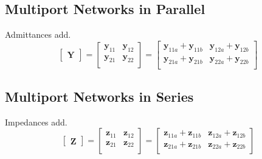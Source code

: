 	\subsection*{Multiport Networks in Parallel} \label{subsec:Parallel Multiport Networks}
	Admittances add.
		\begin{equation*} \label{eq:Parallel Multiport Networks}
			\begin{bmatrix}
				\mathbf{Y}
			\end{bmatrix}
			= \begin{bmatrix}
				\mathbf{y}_{11} & \mathbf{y}_{12} \\
				\mathbf{y}_{21} & \mathbf{y}_{22} \\
			\end{bmatrix}
			= \begin{bmatrix}
				\mathbf{y}_{11a}+\mathbf{y}_{11b} & \mathbf{y}_{12a}+\mathbf{y}_{12b} \\
				\mathbf{y}_{21a}+\mathbf{y}_{21b} & \mathbf{y}_{22a}+\mathbf{y}_{22b} \\
			\end{bmatrix}
		\end{equation*}
	
	\vspace{-4mm}	
	\subsection*{Multiport Networks in Series} \label{subsec:Series Multiport Networks}
	Impedances add.
		\begin{equation*} \label{eq:Series Multiport Networks}
			\begin{bmatrix}
				\mathbf{Z}
			\end{bmatrix}
			= \begin{bmatrix}
				\mathbf{z}_{11} & \mathbf{z}_{12} \\
				\mathbf{z}_{21} & \mathbf{z}_{22} \\
			\end{bmatrix}
			= \begin{bmatrix}
				\mathbf{z}_{11a}+\mathbf{z}_{11b} & \mathbf{z}_{12a}+\mathbf{z}_{12b} \\
				\mathbf{z}_{21a}+\mathbf{z}_{21b} & \mathbf{z}_{22a}+\mathbf{z}_{22b} \\
			\end{bmatrix}
		\end{equation*}	
	
	\vspace{-4mm}
